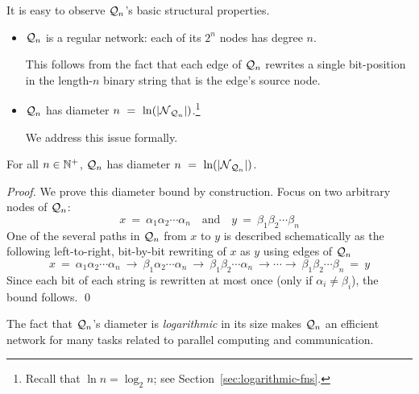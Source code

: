 \medskip

\noindent
It is easy to observe $\mbox{$\cal Q$}_n$'s basic structural properties.
\begin{itemize}
\item {}
$\mbox{$\cal Q$}_n$ is a regular network: each of its $2^n$ nodes has degree $n$.

This follows from the fact that each edge of $\mbox{$\cal Q$}_n$ rewrites a single
bit-position in the length-$n$ binary string that is the edge's source
node.

\item {}
$\mbox{$\cal Q$}_n$ has diameter $n \ = \ \ln(|\mbox{$\cal N$}_{\mbox{{\scriptsize $\cal Q$}}_n}|)$.\footnote{Recall that
  $\ln n = \log_2 n$; see Section~\ref{sec:logarithmic-fns}.}

We address this issue formally.
\end{itemize}

\begin{prop}
\label{thm:hypercube-diameter}
For all $n \in \mathbb{N}^+$, $\mbox{$\cal Q$}_n$ has diameter $n \ = \ \ln(|\mbox{$\cal N$}_{\mbox{{\scriptsize $\cal Q$}}_n}|)$.
\end{prop}

\begin{proof}
We prove this diameter bound by construction.  Focus on two arbitrary
nodes of $\mbox{$\cal Q$}_n$:
\[ x \ = \ \alpha_1 \alpha_2 \cdots \alpha_n \ \ \ \mbox{ and } \ \ \
y \ = \ \beta_1 \beta_2 \cdots \beta_n
\]
One of the several paths in $\mbox{$\cal Q$}_n$ from $x$ to $y$ is described
schematically as the following left-to-right, bit-by-bit rewriting of
$x$ as $y$ using edges of $\mbox{$\cal Q$}_n$
\[
x \ = \ \alpha_1 \alpha_2 \cdots \alpha_n \ \rightarrow \
\beta_1 \alpha_2 \cdots \alpha_n \ \rightarrow \
\beta_1 \beta_2\cdots \alpha_n \ \rightarrow \cdots \rightarrow\ 
\beta_1 \beta_2 \cdots \beta_n \ = \ y
\]
Since each bit of each string is rewritten at most once (only if $\alpha_i \neq \beta_i$), the bound follows.
\qed
\end{proof}

\medskip

The fact that $\mbox{$\cal Q$}_n$'s diameter is {\em logarithmic} in its size makes
$\mbox{$\cal Q$}_n$ an efficient network for many tasks related to parallel
computing and communication.
\bigskip

